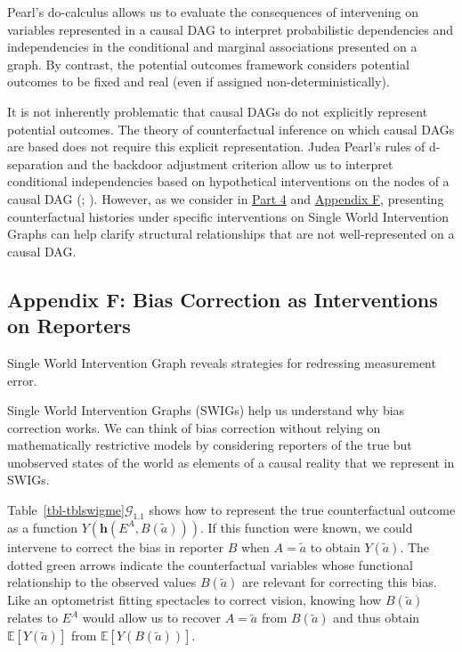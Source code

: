 \documentclass[
  single column]{article}
\begin{document}
Pearl's do-calculus allows us to evaluate the consequences of
intervening on variables represented in a causal DAG to interpret
probabilistic dependencies and independencies in the conditional and
marginal associations presented on a graph. By contrast, the potential
outcomes framework considers potential outcomes to be fixed and real
(even if assigned non-deterministically).

It is not inherently problematic that causal DAGs do not explicitly
represent potential outcomes. The theory of counterfactual inference on
which causal DAGs are based does not require this explicit
representation. Judea Pearl's rules of d-separation and the backdoor
adjustment criterion allow us to interpret conditional independencies
based on hypothetical interventions on the nodes of a causal DAG
(;
). However, as we consider in
\hyperref[id-sec-4]{Part 4} and \hyperref[id-app-f]{Appendix F},
presenting counterfactual histories under specific interventions on
Single World Intervention Graphs can help clarify structural
relationships that are not well-represented on a causal DAG.

\newpage{}

\subsection{Appendix F: Bias Correction as Interventions on
Reporters}\label{id-app-F}

\begin{table}

\caption{\label{tbl-tblswigme}Single World Intervention Graph reveals
strategies for redressing measurement error.}

\centering{

\tblswigme

}

\end{table}%

Single World Intervention Graphs (SWIGs) help us understand why bias
correction works. We can think of bias correction without relying on
mathematically restrictive models by considering reporters of the true
but unobserved states of the world as elements of a causal reality that
we represent in SWIGs.

Table~\ref{tbl-tblswigme}\(\mathcal{G}_{1.1}\) shows how to represent
the true counterfactual outcome as a function
\(Y(\mathbf{h}(E^A, B(\tilde{a})))\). If this function were known, we
could intervene to correct the bias in reporter \(B\) when
\(A = \tilde{a}\) to obtain \(Y(\tilde{a})\). The dotted green arrows
indicate the counterfactual variables whose functional relationship to
the observed values \(B(\tilde{a})\) are relevant for correcting this
bias. Like an optometrist fitting spectacles to correct vision, knowing
how \(B(\tilde{a})\) relates to \(E^A\) would allow us to recover
\(A = \tilde{a}\) from \(B(\tilde{a})\) and thus obtain
\(\mathbb{E}[Y(\tilde{a})]\) from \(\mathbb{E}[Y(B(\tilde{a}))]\).
\end{document}
